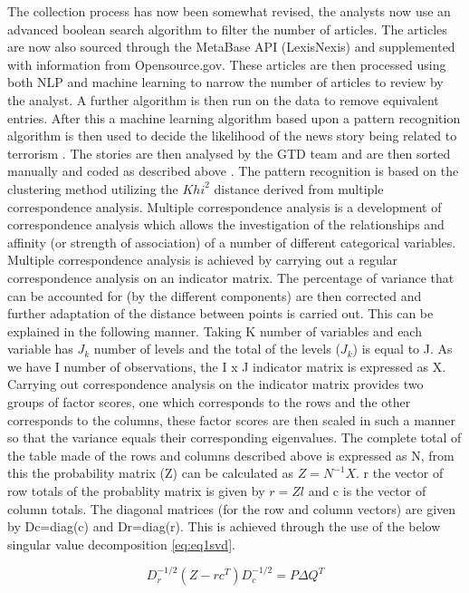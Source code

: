 The collection process has now been somewhat revised, the analysts now use an advanced boolean search algorithm to filter the number of articles. The articles are now also sourced through the MetaBase API (LexisNexis) and supplemented with information from Opensource.gov. These articles are then processed using both NLP and machine learning to narrow the number of articles to review by the analyst. A further algorithm is then run on the data to remove equivalent entries. After this a machine learning algorithm  based upon a pattern recognition algorithm is then used to decide the likelihood of the news story being related to terrorism \citep{fivethirtyeightGTD2015}. The stories are then analysed by the GTD team and are then sorted manually and coded as described above \citep{ben2016pattern}. The pattern recognition is based on the clustering method utilizing the ${Khi}^2$ distance derived from multiple correspondence analysis. Multiple correspondence analysis is a development of correspondence analysis which allows the investigation of the relationships and affinity (or strength of association) of a number of different categorical variables. Multiple correspondence analysis is achieved by carrying out a regular correspondence analysis on an indicator matrix. The percentage of variance that can be accounted for (by the different components) are then corrected and further adaptation of the distance between points is carried out. This can be explained in the following manner. Taking K number of variables and each variable has $J_{k}$ number of levels and the total of the levels ($J_{k}$) is equal to J. As we have I number of  observations, the I x J indicator matrix is expressed as X. Carrying out correspondence analysis on the indicator matrix provides two groups of factor scores, one which corresponds to the rows and the other corresponds to the columns, these factor scores are then scaled in such a manner so that the variance equals their corresponding eigenvalues. The complete total of the table made of the rows and columns described above is expressed as N, from this the probability matrix (Z) can be calculated as  $Z = N^{-1}X$. r the vector of row totals of the probablity matrix is given by $r=Zl$ and c is the vector of column totals. The diagonal  matrices (for the row and column vectors) are given by Dc=diag(c) and Dr=diag(r). This is achieved through the use of the below singular value decomposition \ref{eq:eq1svd}. 

\begin{equation} D_{r}^{-1/2}(Z-rc^{T})D_{c}^{-1/2}=P\Delta Q^{T}  \label{eq:eq1svd} \end{equation}

